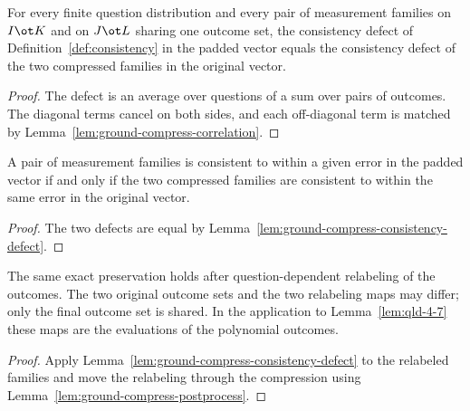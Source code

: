 	\begin{lemma}
		\label{lem:ground-compress-consistency-defect}
		\leanok
		For every finite question distribution and every pair of measurement
		families on $I \ot K$ and on $J \ot L$ sharing one outcome set, the
		consistency defect of Definition~\ref{def:consistency} in the padded vector
		equals the consistency defect of the two compressed families in the
		original vector.
	\end{lemma}
	\begin{proof}
		\leanok
		The defect is an average over questions of a sum over pairs of outcomes.
		The diagonal terms cancel on both sides, and each off-diagonal term is
		matched by Lemma~\ref{lem:ground-compress-correlation}.
	\end{proof}

	\begin{lemma}
		\label{lem:ground-compress-consistency-iff}
		\leanok
		A pair of measurement families is consistent to within a given error in the
		padded vector if and only if the two compressed families are consistent to
		within the same error in the original vector.
	\end{lemma}
	\begin{proof}
		\leanok
		The two defects are equal by
		Lemma~\ref{lem:ground-compress-consistency-defect}.
	\end{proof}

	\begin{lemma}
		\label{lem:ground-compress-consistency-postprocess}
		\leanok
		The same exact preservation holds after question-dependent relabeling of
		the outcomes. The two original outcome sets and the two relabeling maps may
		differ; only the final outcome set is shared. In the application to
		Lemma~\ref{lem:qld-4-7} these maps are the evaluations of the polynomial
		outcomes.
	\end{lemma}
	\begin{proof}
		\leanok
		Apply Lemma~\ref{lem:ground-compress-consistency-defect} to the relabeled
		families and move the relabeling through the compression using
		Lemma~\ref{lem:ground-compress-postprocess}.
	\end{proof}

